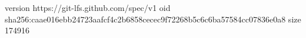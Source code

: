 version https://git-lfs.github.com/spec/v1
oid sha256:caae016ebb24723aafcf4c2b6858cecec9f72268b5c6c6ba57584cc07836e0a8
size 174916
